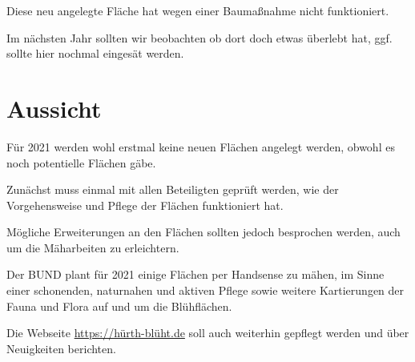 \documentclass[11pt]{article}
\begin{document}
Diese neu angelegte Fläche hat wegen einer Baumaßnahme nicht funktioniert.

Im nächsten Jahr sollten wir beobachten ob dort doch etwas überlebt hat, ggf. sollte hier nochmal eingesät werden.

\clearpage
\section{Aussicht}
Für 2021 werden wohl erstmal keine neuen Flächen angelegt werden, obwohl es noch potentielle Flächen gäbe.

Zunächst muss einmal mit allen Beteiligten geprüft werden, wie der Vorgehensweise und Pflege der Flächen funktioniert hat.

Mögliche Erweiterungen an den Flächen sollten jedoch besprochen werden, auch um die Mäharbeiten zu erleichtern.

Der BUND plant für 2021 einige Flächen per Handsense zu mähen, im Sinne einer schonenden, naturnahen und aktiven Pflege sowie weitere Kartierungen der Fauna und Flora auf und um die Blühflächen.

Die Webseite \href{https://hürth-blüht.de}{https://hürth-blüht.de} soll auch weiterhin gepflegt werden und über Neuigkeiten berichten.
\end{document}
